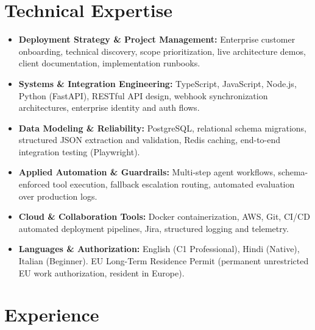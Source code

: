 \documentclass[10pt,a4paper]{article}
\begin{document}
\section{Technical Expertise}
\begin{itemize}
  \item \textbf{Deployment Strategy \& Project Management:} Enterprise customer onboarding, technical discovery, scope prioritization, live architecture demos, client documentation, implementation runbooks.
  \item \textbf{Systems \& Integration Engineering:} TypeScript, JavaScript, Node.js, Python (FastAPI), RESTful API design, webhook synchronization architectures, enterprise identity and auth flows.
  \item \textbf{Data Modeling \& Reliability:} PostgreSQL, relational schema migrations, structured JSON extraction and validation, Redis caching, end-to-end integration testing (Playwright).
  \item \textbf{Applied Automation \& Guardrails:} Multi-step agent workflows, schema-enforced tool execution, fallback escalation routing, automated evaluation over production logs.
  \item \textbf{Cloud \& Collaboration Tools:} Docker containerization, AWS, Git, CI/CD automated deployment pipelines, Jira, structured logging and telemetry.
  \item \textbf{Languages \& Authorization:} English (C1 Professional), Hindi (Native), Italian (Beginner). EU Long-Term Residence Permit (permanent unrestricted EU work authorization, resident in Europe).
\end{itemize}

\section{Experience}
\end{document}
